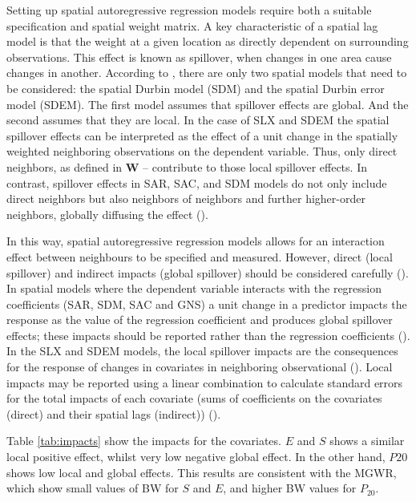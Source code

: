 \documentclass[
  manuscript=article,  
  layout=preprint,  
  year=2023,
  volume=0,
]{format}
\begin{document}
\par Setting up spatial autoregressive regression models require both a suitable specification and spatial weight matrix. A key characteristic of a spatial lag model is that the weight at a given location as directly dependent on surrounding observations. This effect is known as spillover, when changes in one area cause changes in another. According to \cite{lesage2014spatial}, there are only two spatial models that need to be considered: the spatial Durbin model (SDM) and the spatial Durbin error model (SDEM). The first model assumes that spillover effects are global. And the second assumes that they are local. In the case of SLX and SDEM the spatial spillover effects can be interpreted as the effect of a unit change in the spatially weighted neighboring observations on the dependent variable. Thus, only direct neighbors, as defined in \textbf{W} – contribute to those local spillover effects. In contrast, spillover effects in SAR, SAC, and SDM models do not only include direct neighbors but also neighbors of neighbors and further higher-order neighbors, globally diffusing the effect (\cite{lesage2011pitfalls}).

\par In this way, spatial autoregressive regression models allows for an interaction effect between neighbours to be specified and measured. However, direct (local spillover) and indirect impacts (global spillover) should be considered carefully (\cite{anselin2022spatial, elhorst2022dynamic}). In spatial models where the dependent variable interacts with the regression coefficients (SAR, SDM, SAC and GNS) a unit change in a predictor impacts the response as the value of the regression coefficient and produces global spillover effects; these impacts should be reported rather than the regression coefficients (\cite{lesage2014spatial, bivand2022}). In the SLX and SDEM models, the local spillover impacts are the consequences for the response of changes in covariates in neighboring observational (\cite{lesage2011pitfalls}). Local impacts may be reported using a linear combination to calculate standard errors for the total impacts of each covariate (sums of coefficients on the covariates (direct) and their spatial lags (indirect)) (\cite{elhorst2013spatial}).

\par Table \ref{tab:impacts} show the impacts for the covariates. $E$ and $S$ shows a similar local positive effect, whilst very low negative global effect. In the other hand, $P{20}$ shows low local and global effects. This results are consistent with the MGWR, which show small values of BW for $S$ and $E$, and higher BW values for $P_{20}$.
\end{document}
